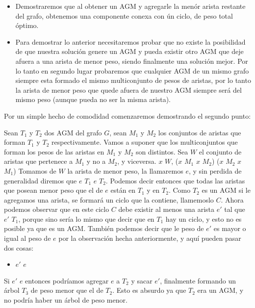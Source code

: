 \begin{itemize}
\item Demostraremos que al obtener un AGM y agregarle la men\'or arista restante del grafo, obtenemos una componente conexa con \'un ciclo, de peso total óptimo.
\item Para demostrar lo anterior necesitaremos probar que no existe la posibilidad de que nuestra soluci\'on genere un AGM y pueda existir otro AGM que deje afuera a una arista de menor peso, siendo finalmente una soluci\'on mejor. Por lo tanto en segundo lugar probaremos que cualquier AGM de un mismo grafo siempre esta formado el mismo multiconjunto de pesos de aristas, por lo tanto la arista de menor peso que quede afuera de nuestro AGM siempre será del mismo peso (aunque pueda no ser la misma arista).
\end{itemize}

Por un simple hecho de comodidad comenzaremos demostrando el segundo punto:

Sean $T_1$ y $T_2$ dos AGM del grafo $G$, sean $M_1$ y $M_2$ los conjuntos de aristas que forman $T_1$ y $T_2$ respectivamente. Vamos a suponer que los multiconjuntos que forman los pesos de las aristas en $M_1$ y $M_2$ son distintos. Sea $W$ el conjunto de aristas que pertenece a $M_1$ y no a $M_2$, y viceversa. \forall $x$ \in $W$, ($x$ \in $M_1$ \wedge $x$ \notin $M_2$) \vee ($x$ \in $M_2$ \wedge $x$ \in $M_1$)
Tomamos de $W$ la arista de menor peso, la llamaremos $e$, y sin perdida de generalidad diremos que $e$ \in $T_1$ \wedge $e$ \notin $T_2$. Podemos decir entonces que todas las aristas que posean menor peso que el de $e$ est\'an en $T_1$ y en $T_2$.
Como $T_2$ es un AGM si le agregamos una arista, se formar\'a un ciclo que la contiene, llamemoslo $C$. Ahora podemos observar que en este ciclo $C$ debe existir al menos una arista $e'$ tal que $e'$ \notin $T_1$, porque sino ser\'ia lo mismo que decir que en $T_1$ hay un ciclo, y esto no es posible ya que es un AGM. Tambi\'en podemos decir que le peso de $e'$ es mayor o igual al peso de $e$ por la observaci\'on hecha anteriormente, y aqu\'i pueden pasar dos cosas:
\begin{itemize}
\item $e'$ \geq $e$
\end{itemize}
Si $e'$ \geq $e$ entonces podr\'iamos agregar $e$ a $T_2$ y sacar $e'$, finalmente formando un \'arbol $T_3$ de peso menor que el de $T_2$. Esto es absurdo ya que $T_2$ era un AGM, y no podr\'ia haber un \'arbol de peso menor.

